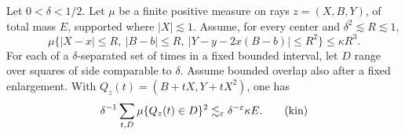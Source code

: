 \begin{lemma}\label{low:kinetic}
Let $0<\delta<1/2$. Let $\mu$ be a finite positive measure on rays
$z=(X,B,Y)$, of total mass $E$, supported where $|X|\lesssim1$. Assume,
for every center and $\delta^2\lesssim R\lesssim1$,
\[
 \mu\bigl\{|X-x|\leq R,\ |B-b|\leq R,
       \ |Y-y-2x(B-b)|\leq R^2\bigr\}\leq\kappa R^3.
\]
For each of a $\delta$-separated set of times in a fixed bounded interval,
let $D$ range over squares of side comparable to $\delta$. Assume bounded
overlap also after a fixed enlargement. With
$Q_z(t)=(B+tX,Y+tX^2)$, one has
\begin{equation}
 \delta^{-1}\sum_{t,D}\mu\{Q_z(t)\in D\}^2
 \lesssim_{\varepsilon}\delta^{-\varepsilon}\kappa E.
 \tag{kin}\label{eq:kin}
\end{equation}
\end{lemma}

